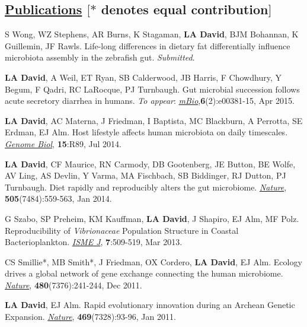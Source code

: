 \documentclass[overlapped,line,11pt]{res}
\begin{document}
\begin{resume}
\section{\underline{\sc Publications} \hspace{2.95in} \sc $[\ast$ denotes equal
      contribution$]$}

\vspace{.25in}

\begin{revnumerate}[13]

\item {S Wong, WZ Stephens, AR Burns, K Stagaman, \textbf{LA David}, BJM
  Bohannan, K Guillemin, JF Rawls.  Life-long differences in dietary
  fat differentially influence microbiota assembly in the zebrafish
  gut. \emph{Submitted}.}

\item {\textbf{LA David}, A Weil, ET Ryan, SB Calderwood, JB Harris, F
  Chowdhury, Y Begum, F Qadri, RC LaRocque, PJ Turnbaugh.  Gut
  microbial succession follows acute secretory diarrhea in humans.
 \emph{To appear}:   \emph{\underline{mBio}},\textbf{6}(2):e00381-15, Apr 2015.}

\item {\textbf{LA David}, AC Materna, J Friedman, I Baptista, MC
  Blackburn, A Perrotta, SE Erdman, EJ Alm.  Host lifestyle affects
  human microbiota on daily timescales.
  \emph{\underline{Genome Biol}}, \textbf{15}:R89, Jul 2014.}

\item {\textbf{LA David}, CF Maurice, RN Carmody, DB Gootenberg, JE
  Button, BE Wolfe, AV Ling, AS Devlin, Y Varma, MA Fischbach, SB
  Biddinger, RJ Dutton, PJ Turnbaugh.  Diet rapidly and reproducibly
  alters the gut microbiome. \emph{\underline{Nature}},
  \textbf{505}(7484):559-563, Jan 2014.}

\item {G Szabo, SP Preheim, KM Kauffman, \textbf{LA David}, J Shapiro,
  EJ Alm, MF Polz.  Reproducibility of \emph{Vibrionaceae} Population
  Structure in Coastal Bacterioplankton. \emph{\underline{ISME J}},
  \textbf{7}:509-519, Mar 2013.}

\item {CS Smillie*, MB Smith*, J Friedman, OX Cordero, \textbf{LA
    David}, EJ Alm.  Ecology drives a global network of gene exchange
  connecting the human microbiome. \emph{\underline{Nature}},
  \textbf{480}(7376):241-244, Dec 2011.}

\item {\textbf{LA David}, EJ Alm.  Rapid evolutionary innovation during
  an Archean Genetic Expansion.  \emph{\underline{Nature}},
  \textbf{469}(7328):93-96, Jan 2011.}


\end{revnumerate}
\end{resume}
\end{document}
